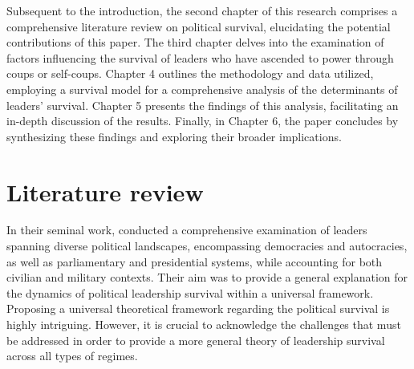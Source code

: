 \documentclass[
  12pt,
  a4paper,
  12pt]{article}
\begin{document}
Subsequent to the introduction, the second chapter of this research
comprises a comprehensive literature review on political survival,
elucidating the potential contributions of this paper. The third chapter
delves into the examination of factors influencing the survival of
leaders who have ascended to power through coups or self-coups. Chapter
4 outlines the methodology and data utilized, employing a survival model
for a comprehensive analysis of the determinants of leaders' survival.
Chapter 5 presents the findings of this analysis, facilitating an
in-depth discussion of the results. Finally, in Chapter 6, the paper
concludes by synthesizing these findings and exploring their broader
implications.

\newpage

\section{Literature review}\label{literature-review}

In their seminal work, \citet{buenodemesquita2003} conducted a
comprehensive examination of leaders spanning diverse political
landscapes, encompassing democracies and autocracies, as well as
parliamentary and presidential systems, while accounting for both
civilian and military contexts. Their aim was to provide a general
explanation for the dynamics of political leadership survival within a
universal framework. Proposing a universal theoretical framework
regarding the political survival is highly intriguing. However, it is
crucial to acknowledge the challenges that must be addressed in order to
provide a more general theory of leadership survival across all types of
regimes.
\end{document}
